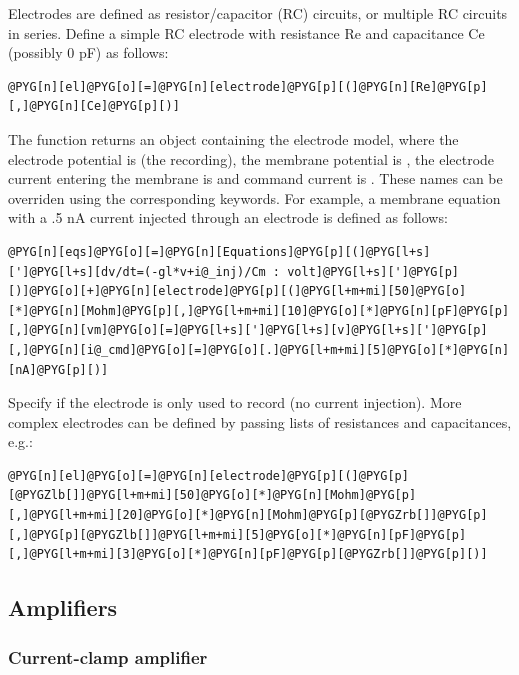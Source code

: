 \documentclass[letterpaper,10pt,english]{manual}
\begin{document}
Electrodes are defined as resistor/capacitor (RC) circuits, or multiple
RC circuits in series. Define a simple RC electrode with resistance Re
and capacitance Ce (possibly 0 pF) as follows:

\begin{Verbatim}[commandchars=@\[\]]
@PYG[n][el]@PYG[o][=]@PYG[n][electrode]@PYG[p][(]@PYG[n][Re]@PYG[p][,]@PYG[n][Ce]@PYG[p][)]
\end{Verbatim}

The  function returns an \hyperlink{brian.Equations}{} object containing the
electrode model, where
the electrode potential is  (the recording), the membrane potential is , the electrode current
entering the membrane is  and command current is .
These names can be overriden using the corresponding keywords. For example, a membrane
equation with a .5 nA current injected through an electrode is defined as follows:

\begin{Verbatim}[commandchars=@\[\]]
@PYG[n][eqs]@PYG[o][=]@PYG[n][Equations]@PYG[p][(]@PYG[l+s][']@PYG[l+s][dv/dt=(-gl*v+i@_inj)/Cm : volt]@PYG[l+s][']@PYG[p][)]@PYG[o][+]@PYG[n][electrode]@PYG[p][(]@PYG[l+m+mi][50]@PYG[o][*]@PYG[n][Mohm]@PYG[p][,]@PYG[l+m+mi][10]@PYG[o][*]@PYG[n][pF]@PYG[p][,]@PYG[n][vm]@PYG[o][=]@PYG[l+s][']@PYG[l+s][v]@PYG[l+s][']@PYG[p][,]@PYG[n][i@_cmd]@PYG[o][=]@PYG[o][.]@PYG[l+m+mi][5]@PYG[o][*]@PYG[n][nA]@PYG[p][)]
\end{Verbatim}

Specify  if the electrode is only used to record (no current injection). More complex
electrodes can be defined by passing lists of resistances and capacitances, e.g.:

\begin{Verbatim}[commandchars=@\[\]]
@PYG[n][el]@PYG[o][=]@PYG[n][electrode]@PYG[p][(]@PYG[p][@PYGZlb[]]@PYG[l+m+mi][50]@PYG[o][*]@PYG[n][Mohm]@PYG[p][,]@PYG[l+m+mi][20]@PYG[o][*]@PYG[n][Mohm]@PYG[p][@PYGZrb[]]@PYG[p][,]@PYG[p][@PYGZlb[]]@PYG[l+m+mi][5]@PYG[o][*]@PYG[n][pF]@PYG[p][,]@PYG[l+m+mi][3]@PYG[o][*]@PYG[n][pF]@PYG[p][@PYGZrb[]]@PYG[p][)]
\end{Verbatim}


\subsection{Amplifiers}


\subsubsection{Current-clamp amplifier}
\end{document}
